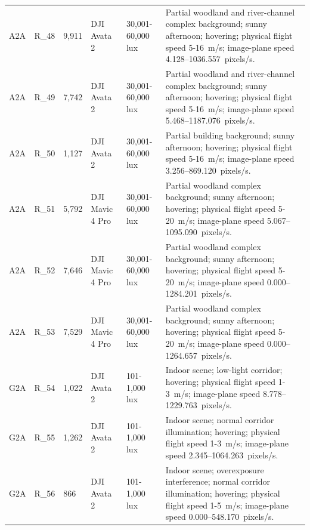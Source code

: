 \begin{longtable}{@{}C{0.045\textwidth} C{0.083\textwidth} C{0.075\textwidth} C{0.13\textwidth} C{0.15\textwidth} L{0.48\textwidth}@{}}
A2A & R\_48 & 9,911 & DJI Avata 2 & 30,001-60,000 lux & Partial woodland and river-channel complex background; sunny afternoon; hovering; physical flight speed 5-16~m/s; image-plane speed 4.128--1036.557~pixels/s. \\

A2A & R\_49 & 7,742 & DJI Avata 2 & 30,001-60,000 lux & Partial woodland and river-channel complex background; sunny afternoon; hovering; physical flight speed 5-16~m/s; image-plane speed 5.468--1187.076~pixels/s. \\

A2A & R\_50 & 1,127 & DJI Avata 2 & 30,001-60,000 lux & Partial building background; sunny afternoon; hovering; physical flight speed 5-16~m/s; image-plane speed 3.256--869.120~pixels/s. \\

A2A & R\_51 & 5,792 & DJI Mavic 4 Pro & 30,001-60,000 lux & Partial woodland complex background; sunny afternoon; hovering; physical flight speed 5-20~m/s; image-plane speed 5.067--1095.090~pixels/s. \\

A2A & R\_52 & 7,646 & DJI Mavic 4 Pro & 30,001-60,000 lux & Partial woodland complex background; sunny afternoon; hovering; physical flight speed 5-20~m/s; image-plane speed 0.000--1284.201~pixels/s. \\

A2A & R\_53 & 7,529 & DJI Mavic 4 Pro & 30,001-60,000 lux & Partial woodland complex background; sunny afternoon; hovering; physical flight speed 5-20~m/s; image-plane speed 0.000--1264.657~pixels/s. \\

G2A & R\_54 & 1,022 & DJI Avata 2 & 101-1,000 lux & Indoor scene; low-light corridor; hovering; physical flight speed 1-3~m/s; image-plane speed 8.778--1229.763~pixels/s. \\

G2A & R\_55 & 1,262 & DJI Avata 2 & 101-1,000 lux & Indoor scene; normal corridor illumination; hovering; physical flight speed 1-3~m/s; image-plane speed 2.345--1064.263~pixels/s. \\

G2A & R\_56 & 866 & DJI Avata 2 & 101-1,000 lux & Indoor scene; overexposure interference; normal corridor illumination; hovering; physical flight speed 1-5~m/s; image-plane speed 0.000--548.170~pixels/s. \\


\end{longtable}
